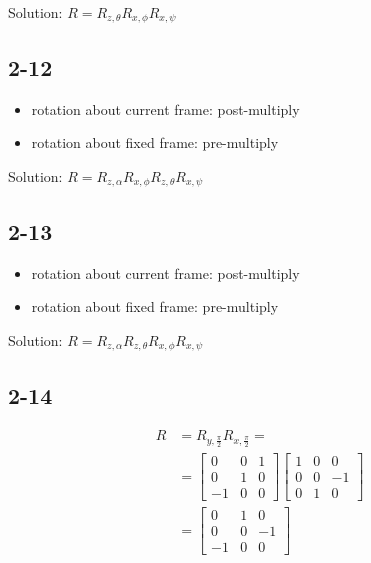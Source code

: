 Solution: $R=R_{z,\theta}R_{x,\phi}R_{x,\psi}$

\subsection*{2-12}
\begin{itemize}
	\item rotation about current frame: post-multiply
	\item rotation about fixed frame: pre-multiply
\end{itemize}

Solution: $R= R_{z,\alpha}R_{x,\phi}R_{z,\theta}R_{x,\psi}$

\subsection*{2-13}

\begin{itemize}
	\item rotation about current frame: post-multiply
	\item rotation about fixed frame: pre-multiply
\end{itemize}

Solution: $R= R_{z,\alpha}R_{z,\theta} R_{x,\phi}R_{x,\psi}$

\subsection*{2-14}
\begin{align*}
R &= R_{y,\frac{\pi}{2}} R_{x,\frac{\pi}{2}}=\\ 
&=\left[\begin{array}{ccc} 
0 & 0 & 1 \\
0 & 1 & 0 \\  
-1 & 0 & 0    
\end{array}\right]
\left[\begin{array}{ccc} 
1 & 0 & 0 \\
0 & 0 & -1 \\  
0 & 1 & 0    
\end{array}\right]\\
&=\left[\begin{array}{ccc} 
0 & 1 & 0 \\
0 & 0 & -1 \\  
-1 & 0 & 0    
\end{array}\right]
\end{align*}

